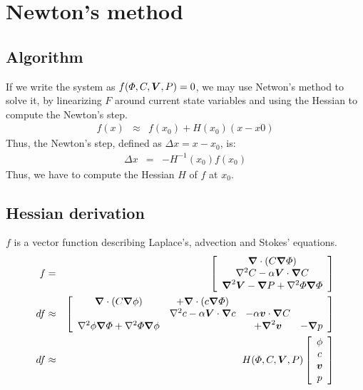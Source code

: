 \section{Newton's method}
\subsection{Algorithm}
If we write the system as $f(\varPhi,C,\boldsymbol{V},P) = 0$, we may use Netwon's method to solve it, by linearizing $F$ around current state variables
and using the Hessian to compute the Newton's step.
\begin{eqnarray}
  f(x) &\approx & f(x_0) + H(x_0) (x - x0)
\end{eqnarray}
Thus, the Newton's step, defined as $\Delta x = x - x_0$, is:
\begin{eqnarray}
  \Delta x &=& -H^{-1}(x_0) f(x_0)
\end{eqnarray}
Thus, we have to compute the Hessian $H$ of $f$ at $x_0$.

\subsection{Hessian derivation}
$f$ is a vector function describing Laplace's, advection and Stokes'
equations.
\begin{eqnarray}
  f &=& \left[\begin{array}{c}
  \boldsymbol{\nabla} \cdot (C \boldsymbol{\nabla} \varPhi) \\
  \nabla^2 C - \alpha \boldsymbol{V} \cdot \boldsymbol{\nabla} C \\
  \boldsymbol{\nabla}^2 \boldsymbol{V} - \boldsymbol{\nabla} P + \nabla^2 \varPhi \boldsymbol{\nabla} \varPhi
  \end{array}\right]
  \\
  df & \approx & \left[\begin{array}{cccc}
  \boldsymbol{\nabla} \cdot (C \boldsymbol{\nabla} \phi) &+ \boldsymbol{\nabla} \cdot (c \boldsymbol{\nabla} \varPhi) & & \\
  &\nabla^2 c - \alpha \boldsymbol{V} \cdot \boldsymbol{\nabla} c &- \alpha \boldsymbol{v} \cdot \boldsymbol{\nabla} C&\\
  \nabla^2 \phi \boldsymbol{\nabla} \varPhi +
  \nabla^2 \varPhi \boldsymbol{\nabla} \phi &
  & +\boldsymbol{\nabla}^2 \boldsymbol{v} &- \boldsymbol{\nabla} p
  \end{array}\right] \\ 
  df & \approx & H(\varPhi,C,\boldsymbol{V},P) \left[\begin{array}{c} 
  \phi \\ c \\ \boldsymbol{v} \\ p
  \end{array}\right]
\end{eqnarray}

